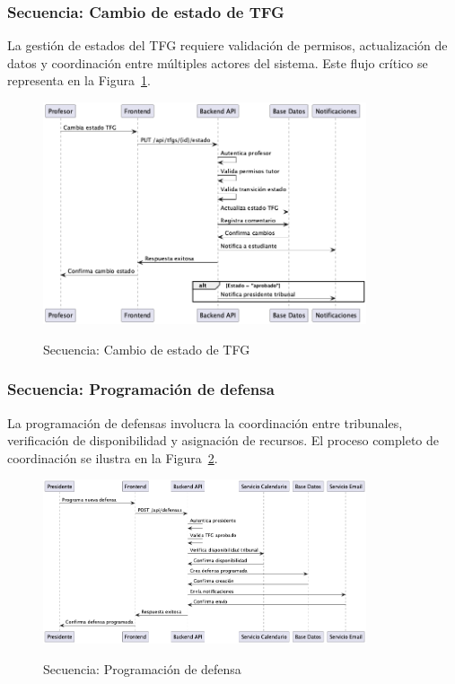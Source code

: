 \documentclass[12pt,a4paper,oneside]{report}
\providecommand{\pandocbounded}[1]{#1}
\begin{document}
\subsubsection{Secuencia: Cambio de estado de
TFG}\label{secuencia-cambio-de-estado-de-tfg}

La gestión de estados del TFG requiere validación de permisos, actualización de datos y coordinación entre múltiples actores del sistema. Este flujo crítico se representa en la Figura~\ref{fig:secuencia-cambio-estado}.

\begin{figure}[H]
\centering
\pandocbounded{\includegraphics[keepaspectratio,width=0.85\textwidth,alt={Secuencia: Cambio de estado de TFG}]{processed/images/04_analisis_sistema_plantuml_2.png}}
\caption{Secuencia: Cambio de estado de TFG}
\label{fig:secuencia-cambio-estado}
\end{figure}

\subsubsection{Secuencia: Programación de
defensa}\label{secuencia-programaciuxf3n-de-defensa}

La programación de defensas involucra la coordinación entre tribunales, verificación de disponibilidad y asignación de recursos. El proceso completo de coordinación se ilustra en la Figura~\ref{fig:secuencia-programacion-defensa}.

\begin{figure}[H]
\centering
\pandocbounded{\includegraphics[keepaspectratio,width=0.85\textwidth,alt={Secuencia: Programación de defensa}]{processed/images/04_analisis_sistema_plantuml_3.png}}
\caption{Secuencia: Programación de defensa}
\label{fig:secuencia-programacion-defensa}
\end{figure}
\end{document}

